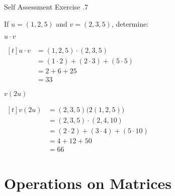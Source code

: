 \documentclass[\main/notes.tex]{subfiles}
\begin{document}
			\begin{exercise}{Self Assessment Exercise \thechapter.7}
				\begin{questions}
					\item If $u = (1, 2, 5)$ and $v = (2, 3, 5)$, determine:
						\begin{questions}
							\item $u \cdot v$ \hfill
								\begin{answer}
									$ \begin{aligned}[t]
										u \cdot v &= (1, 2, 5) \cdot (2, 3, 5)\\
										&= (1 \cdot 2) + (2 \cdot 3) + (5 \cdot 5)\\
										&= 2 + 6 + 25\\
										&= 33
									\end{aligned} $\hfill \phantom{}
								\end{answer}
							\item $v(2u)$ \hfill
								\begin{answer}
									$ \begin{aligned}[t]
										v(2u) &= (2, 3, 5)\bigl(2(1, 2, 5)\bigr)\\
										&= (2, 3, 5) \cdot (2, 4, 10)\\
										&= (2 \cdot 2) + (3 \cdot 4) + (5 \cdot 10)\\
										&= 4 + 12 + 50\\
										&= 66
									\end{aligned} $ \hfill \phantom{}
								\end{answer}
						\end{questions}
				\end{questions}
			\end{exercise}
		\pagebreak
		\section{Operations on Matrices}
\end{document}

